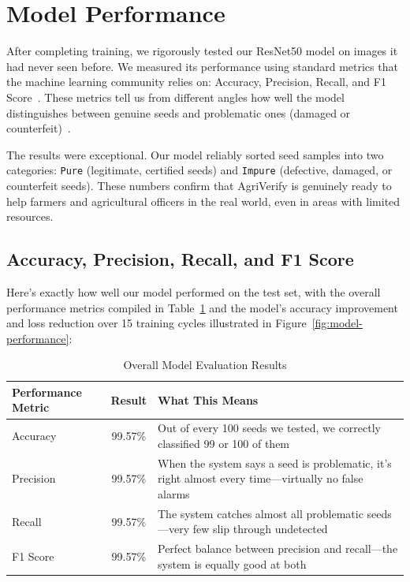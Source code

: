 
\section{Model Performance}

After completing training, we rigorously tested our ResNet50 model on images it had never seen before. We measured its performance using standard metrics that the machine learning community relies on: Accuracy, Precision, Recall, and F1 Score~\cite{mohanty2016}. These metrics tell us from different angles how well the model distinguishes between genuine seeds and problematic ones (damaged or counterfeit)~\cite{he2016deep, xu2021}.

The results were exceptional. Our model reliably sorted seed samples into two categories: \texttt{Pure} (legitimate, certified seeds) and \texttt{Impure} (defective, damaged, or counterfeit seeds). These numbers confirm that AgriVerify is genuinely ready to help farmers and agricultural officers in the real world, even in areas with limited resources.

\subsection{Accuracy, Precision, Recall, and F1 Score}

Here's exactly how well our model performed on the test set, with the overall performance metrics compiled in Table~\ref{tab:overallmetrics} and the model's accuracy improvement and loss reduction over 15 training cycles illustrated in Figure~\ref{fig:model-performance}:

\begin{table}[htbp]
  \centering
  \caption{Overall Model Evaluation Results}
  \label{tab:overallmetrics}
  \renewcommand{\arraystretch}{1.35}
  \begin{tabularx}{\textwidth}{@{} l c X @{}}
    \toprule
    \textbf{Performance Metric} & \textbf{Result} & \textbf{What This Means} \\
    \midrule
    Accuracy & 99.57\% & Out of every 100 seeds we tested, we correctly classified 99 or 100 of them \\
    \addlinespace
    Precision & 99.57\% & When the system says a seed is problematic, it's right almost every time—virtually no false alarms \\
    \addlinespace
    Recall & 99.57\% & The system catches almost all problematic seeds—very few slip through undetected \\
    \addlinespace
    F1 Score & 99.57\% & Perfect balance between precision and recall—the system is equally good at both \\
    \bottomrule
  \end{tabularx}
\end{table}


